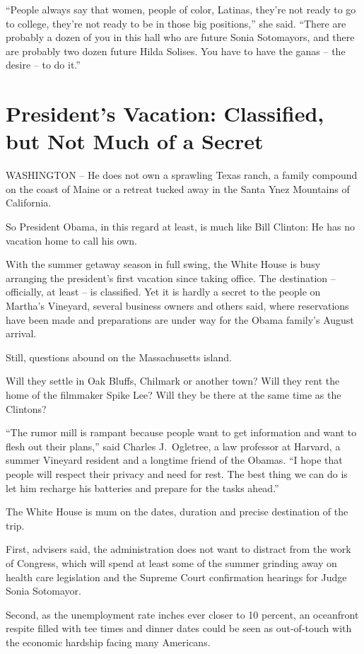 ﻿\documentclass[12pt]{article}
\begin{document}
``People always say that women, people of color, Latinas, they're not ready to go to college,
they're not ready to be in those big positions,'' she said. ``There are probably a dozen of you in
this hall who are future Sonia Sotomayors, and there are probably two dozen future Hilda Solises.
You have to have the ganas -- the desire -- to do it.''

\section{President's Vacation: Classified, but Not Much of a Secret}

WASHINGTON -- He does not own a sprawling Texas ranch, a family compound on the coast of Maine or a
retreat tucked away in the Santa Ynez Mountains of California.

So President Obama, in this regard at least, is much like Bill Clinton: He has no vacation home to
call his own.

With the summer getaway season in full swing, the White House is busy arranging the president's
first vacation since taking office. The destination -- officially, at least -- is classified. Yet it
is hardly a secret to the people on Martha's Vineyard, several business owners and others said,
where reservations have been made and preparations are under way for the Obama family's August
arrival.

Still, questions abound on the Massachusetts island.

Will they settle in Oak Bluffs, Chilmark or another town? Will they rent the home of the filmmaker
Spike Lee? Will they be there at the same time as the Clintons?

``The rumor mill is rampant because people want to get information and want to flesh out their
plans,'' said Charles J.~Ogletree, a law professor at Harvard, a summer Vineyard resident and a
longtime friend of the Obamas. ``I hope that people will respect their privacy and need for rest.
The best thing we can do is let him recharge his batteries and prepare for the tasks ahead.''

The White House is mum on the dates, duration and precise destination of the trip.

First, advisers said, the administration does not want to distract from the work of Congress, which
will spend at least some of the summer grinding away on health care legislation and the Supreme
Court confirmation hearings for Judge Sonia Sotomayor.

Second, as the unemployment rate inches ever closer to 10 percent, an oceanfront respite filled with
tee times and dinner dates could be seen as out-of-touch with the economic hardship facing many
Americans.
\end{document}
